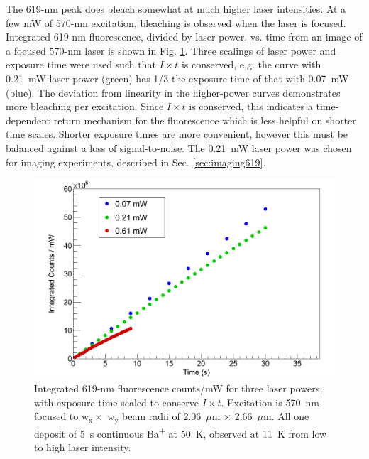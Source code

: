 The 619-nm peak does bleach somewhat at much higher laser intensities.  At a few mW of 570-nm excitation, bleaching is observed when the laser is focused.  Integrated 619-nm fluorescence, divided by laser power, vs. time from an image of a focused 570-nm laser is shown in Fig. \ref{fig:bleaching619}.  Three scalings of laser power and exposure time were used such that $I \times t$ is conserved, e.g. the curve with 0.21~mW laser power (green) has 1/3 the exposure time of that with 0.07~mW (blue).  The deviation from linearity in the higher-power curves demonstrates more bleaching per excitation.  Since $I \times t$ is conserved, this indicates a time-dependent return mechanism for the fluorescence which is less helpful on shorter time scales.  Shorter exposure times are more convenient, however this must be balanced against a loss of signal-to-noise.  The 0.21~mW laser power was chosen for imaging experiments, described in Sec. \ref{sec:imaging619}.

\begin{figure} %
        \centering
                \includegraphics[width=.7\textwidth]{figures/619_bleach_summed_per_mW.png}
                \caption{Integrated 619-nm fluorescence counts/mW for three laser powers, with exposure time scaled to conserve $I \times t$.  Excitation is 570~nm focused to w$_{\text{x}} \times$ w$_{\text{y}}$ beam radii of 2.06~$\mu$m $\times$ 2.66~$\mu$m. All one deposit of 5~s continuous Ba\textsuperscript{+} at 50~K, observed at 11~K from low to high laser intensity.}
\label{fig:bleaching619}
\end{figure}



